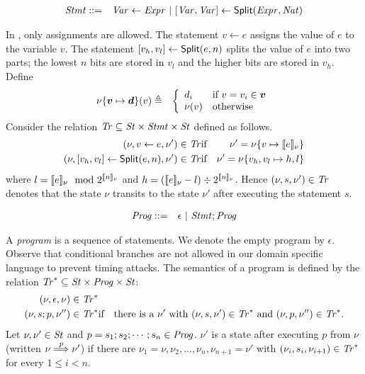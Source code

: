 \begin{eqnarray*}
  \mathit{Stmt} & ::= & \mathit{Var} \leftarrow \mathit{Expr}
            \ |\  {[}{\mathit{Var}}, {\mathit{Var}}{]} \leftarrow \mbox{\textsf{Split}} (\mathit{Expr}, \mathit{Nat})\\
\end{eqnarray*}

In \mydsl, only assignments are allowed.
The statement $v \leftarrow e$ assigns the value of $e$
to the variable $v$. The statement ${[}{v_h}, {v_l}{]} \leftarrow
\mbox{\textsf{Split}}(e, n)$ splits the value of $e$ into two parts;
the lowest $n$ bits are stored in $v_l$ and the higher bits
are stored in $v_h$. Define
\begin{eqnarray*}
\nu\mymapsto{\vv}{\vd}(v) & \defn &
\left\{
   \begin{array}{ll}
     d_i & \textmd{if $v = v_i \in \vv$}\\
     \nu(v) & \textmd{otherwise}
   \end{array}
\right.
\end{eqnarray*}
Consider the relation $\mathit{Tr} \subseteq \mathit{St} \times \mathit{Stmt} \times \mathit{St}$ defined
as follows. 
\begin{eqnarray*}
  (\nu, v \leftarrow e, \nu') \in \mathit{Tr} & \textmd{if} &
  \nu' = \nu\{{v} \mapsto {[\![{e}]\!]_{\nu}}\}\\
  (\nu, {[}{v_h}, {v_l}{]} \leftarrow \mbox{\textsf{Split}} (e, n), \nu') \in
  \mathit{Tr} & \textmd{if} &
  \nu' = \nu\{{v_h, v_l} \mapsto {h, l}\}
\end{eqnarray*}
where
$l = [\![{e}]\!]_{\nu} \mod 2^{[\![{n}]\!]_{\nu}}$ and
$h = ([\![{e}]\!]_{\nu} - l) \div 2^{[\![{n}]\!]_{\nu}}$.
Hence $(\nu, s, \nu') \in \mathit{Tr}$ denotes that the state $\nu$ transits to 
the state $\nu'$ after executing the statement $s$.

\begin{eqnarray*}
  \mathit{Prog} & ::= & \epsilon \ |\ \mathit{Stmt}; \mathit{Prog}
\end{eqnarray*}

A \emph{program} is a sequence of statements. We denote the empty program by 
$\epsilon$. Observe that conditional branches are not allowed in our
domain specific language to prevent timing attacks. The semantics of a
program is defined by the relation 
$\mathit{Tr}^* \subseteq \mathit{St} \times \mathit{Prog} \times \mathit{St}$:
\begin{eqnarray*}
  (\nu, \epsilon, \nu) \in \mathit{Tr}^*\\
  (\nu, s; p, \nu'') \in \mathit{Tr}^* & \textmd{if} &
    \textmd{there is a } \nu' \textmd{ with }
    (\nu, s, \nu') \in \mathit{Tr}^* \textmd{ and }
    (\nu, p, \nu'') \in \mathit{Tr}^*.
\end{eqnarray*}
Let $\nu, \nu' \in \mathit{St}$ and $p = s_1; s_2; \cdots; s_n \in
\mathit{Prog}$. $\nu'$ is a state after executing $p$ from $\nu$
(written $\nu \overset{p}{\Longrightarrow} \nu'$) if there are $\nu_1 = \nu, \nu_2,
\ldots, \nu_n, \nu_{n+1} = \nu'$ with $(\nu_i, s_i, \nu_{i+1}) \in
\mathit{Tr}^*$ for every $1 \leq i < n$.

